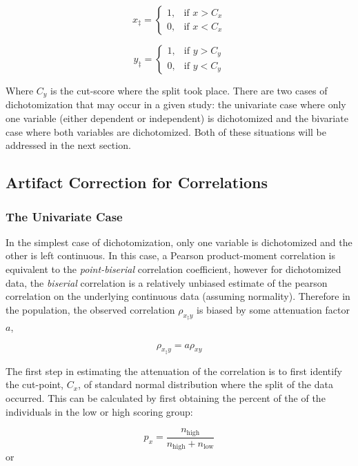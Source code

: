 \documentclass[
  letterpaper,
  DIV=11,
  numbers=noendperiod]{scrreprt}
\begin{document}
\[
 x_\ddagger= 
\begin{cases}
    1,& \text{if } x>C_x\\
    0,& \text{if } x<C_x
\end{cases}
\]

\[
 y_\ddagger= 
\begin{cases}
    1,& \text{if } y>C_y\\
    0,& \text{if } y<C_y
\end{cases}
\]

Where \(C_y\) is the cut-score where the split took place. There are two
cases of dichotomization that may occur in a given study: the univariate
case where only one variable (either dependent or independent) is
dichotomized and the bivariate case where both variables are
dichotomized. Both of these situations will be addressed in the next
section.

\hypertarget{sec-corr-artifacts}{%
\subsection{Artifact Correction for
Correlations}\label{sec-corr-artifacts}}

\hypertarget{the-univariate-case}{%
\subsubsection*{The Univariate Case}\label{the-univariate-case}}

In the simplest case of dichotomization, only one variable is
dichotomized and the other is left continuous. In this case, a Pearson
product-moment correlation is equivalent to the \emph{point-biserial}
correlation coefficient, however for dichotomized data, the
\emph{biserial} correlation is a relatively unbiased estimate of the
pearson correlation on the underlying continuous data (assuming
normality). Therefore in the population, the observed correlation
\(\rho_{x_\ddagger y}\) is biased by some attenuation factor \(a\),

\[
\rho_{x_\ddagger y} = a\rho_{xy}
\]

The first step in estimating the attenuation of the correlation is to
first identify the cut-point, \(C_x\), of standard normal distribution
where the split of the data occurred. This can be calculated by first
obtaining the percent of the of the individuals in the low or high
scoring group:

\[
p_x = \frac{ n_{\text{high}} }{n_{\text{high}} + n_{\text{low}}}
\] or
\end{document}
